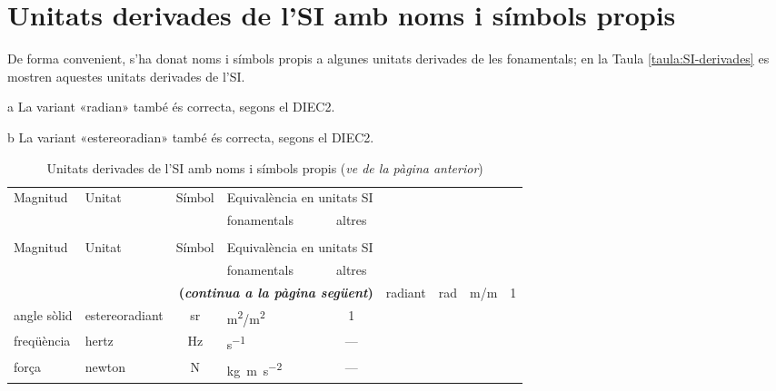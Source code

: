 \section{Unitats derivades de l'SI amb noms i símbols propis}

De forma convenient, s'ha donat noms i símbols propis a algunes unitats derivades de les fonamentals; en la Taula \vref{taula:SI-derivades} es mostren aquestes unitats derivades de l'SI.

\begin{ThreePartTable}
\begin{TableNotes}
    \item[a] {\footnotesize La variant «radian» també és correcta, segons el DIEC2.}
    \item[b] {\footnotesize La variant «estereoradian» també és correcta, segons el DIEC2.}
\end{TableNotes}
\begin{longtable}[h]{llclc}
   \caption{\label{taula:SI-derivades} Unitats derivades de
   l'SI amb noms i símbols propis}\\
   \toprule[1pt]
    \multirow{2}{15mm}{\rule{0mm}{6mm}Magnitud} & \multirow{2}{15mm}{\rule{0mm}{6mm}Unitat}  &
    \multirow{2}{15mm}{\rule{0mm}{6mm}Símbol}  & \multicolumn{2}{c}{Equivalència en unitats SI}\\
    \cmidrule(rl){4-5}
    &  &   & fonamentals & altres\\
   \midrule
   \endfirsthead
   \caption[]{Unitats derivades de l'SI amb noms i símbols propis (\emph{ve de la pàgina
   anterior})}\\
   \toprule[1pt]
    \multirow{2}{15mm}{\rule{0mm}{6mm}Magnitud} & \multirow{2}{15mm}{\rule{0mm}{6mm}Unitat}  &
    \multirow{2}{15mm}{\rule{0mm}{6mm}Símbol}  & \multicolumn{2}{c}{Equivalència en unitats SI}\\
    \cmidrule(rl){4-5}
    &  &  & fonamentals & altres\\
   \midrule
   \endhead
   \midrule
   \multicolumn{5}{r}{\sffamily\bfseries\color{NavyBlue}(\emph{continua a la pàgina següent})}
   \endfoot
   \insertTableNotes
   \endlastfoot
   angle pla & radiant\tnote{a} & rad   & \si{m/m} & 1\\
   angle sòlid & estereoradiant\tnote{b} & sr & \si{m^2/m^2}  & 1 \\
   freqüència & hertz & Hz & \si{s^{-1}} & --- \\
   força & newton & N & \si{kg.m.s^{-2}} & --- \\

\end{longtable}
\end{ThreePartTable}
